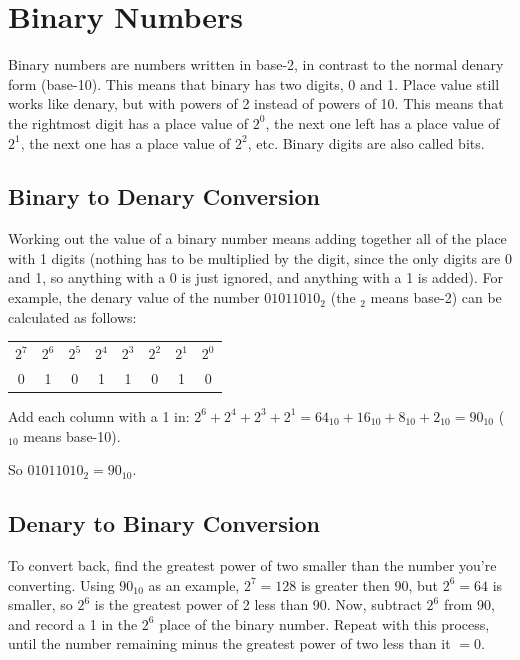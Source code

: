     \newpage

\section{Binary Numbers} \label{binary_numbers}
    Binary numbers are numbers written in base-2, in contrast to the normal denary form (base-10).
    This means that binary has two digits, 0 and 1.
    Place value still works like denary, but with powers of 2 instead of powers of 10.
    This means that the rightmost digit has a place value of $2^0$, the next one left has a place value of $2^1$, the next one has a place value of $2^2$, etc.
    Binary digits are also called bits.

    \subsection{Binary to Denary Conversion}
        Working out the value of a binary number means adding together all of the place with 1 digits (nothing has to be multiplied by the digit, since the only digits are 0 and 1, so anything with a 0 is just ignored, and anything with a 1 is added).
        For example, the denary value of the number $01011010_2$ (the $_2$ means base-2) can be calculated as follows:
        \begin{center}
        \begin{tabular}{c c c c c c c c}
            $2^7$&$2^6$&$2^5$&$2^4$&$2^3$&$2^2$&$2^1$&$2^0$ \\
            0  &  1  &  0  &  1  &  1  &  0  &  1  &  0
        \end{tabular}
        \end{center}
        Add each column with a 1 in:
        $2^6+2^4+2^3+2^1=64_{10}+16_{10}+8_{10}+2_{10}=90_{10}$ ($_{10}$ means base-10).

        So $01011010_2=90_{10}$.

    \subsection{Denary to Binary Conversion}
        To convert back, find the greatest power of two smaller than the number you're converting.
        Using $90_{10}$ as an example, $2^7=128$ is greater then 90, but $2^6=64$ is smaller, so $2^6$ is the greatest power of 2 less than 90.
        Now, subtract $2^6$ from 90, and record a 1 in the $2^6$ place of the binary number.
        Repeat with this process, until the number remaining minus the greatest power of two less than it $=0$.

